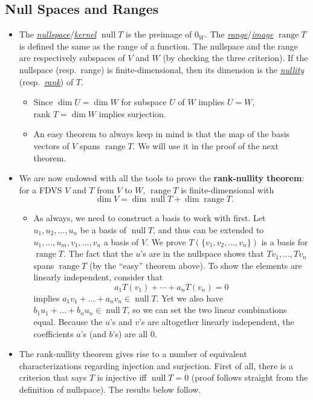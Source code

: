 \documentclass{article}
\newcommand{\df}[1]{\ul{\textit{#1}}}
\newcommand{\n}{\operatorname{null}}
\renewcommand{\r}{\operatorname{range}}
\renewcommand{\d}{\dim}
\begin{document}
\subsection{Null Spaces and Ranges}
\begin{itemize}
    \item The \df{nullspace}/\df{kernel} $\n T$ is the preimage of $0_W$. The \df{range}/\df{image} $\r T$ is defined the same as the range of a function. The nullspace and the range are respectively subspaces of $V$ and $W$ (by checking the three criterion). If the nullspace (resp.\ range) is finite-dimensional, then its dimension is the \df{nullity} (resp.\ \df{rank}) of $T$.
    \begin{itemize}
        \item Since $\d U = \d W$ for subspace $U$ of $W$ implies $U = W$, $\text{rank }T = \d W$ implies surjection.
        \item An easy theorem to always keep in mind is that the map of the basis vectors of $V$ spans $\r T$. We will use it in the proof of the next theorem.
    \end{itemize}
    \item We are now endowed with all the tools to prove the \textbf{rank-nullity theorem}: for a FDVS $V$ and $T$ from $V$ to $W$, $\r T$ is finite-dimensional with $$\d V = \d \n T + \d \r T.$$
    \begin{itemize}
        \item As always, we need to construct a basis to work with first. Let ${u_1, u_2, \dots, u_n}$ be a basis of $\n T$, and thus can be extended to ${u_1,\dots,u_m,v_1,\dots,v_n}$ a basis of $V$. We prove $T(\{v_1, v_2, \dots, v_n\})$ is a basis for $\r T$. The fact that the $u$'s are in the nullspace shows that $Tv_1, \dots,Tv_n$ spans $\r T$ (by the ``easy'' theorem above). To show the elements are linearly independent, consider that $$a_1 T(v_1)+\cdots+a_n T(v_n) = 0$$ implies $a_1v_1+\dots+a_nv_n \in \n T$. Yet we also have $b_1u_1+\dots+b_nu_n \in \n T$, so we can set the two linear combinations equal. Because the $u$'s and $v$'s are altogether linearly independent, the coefficients $a$'s (and $b$'s) are all 0.
    \end{itemize}
    \item The rank-nullity theorem gives rise to a number of equivalent characterizations regarding injection and surjection. First of all, there is a criterion that says $T$ is injective iff $\n T = {0}$ (proof follows straight from the definition of nullspace). The results below follow.

\end{itemize}
\end{document}
